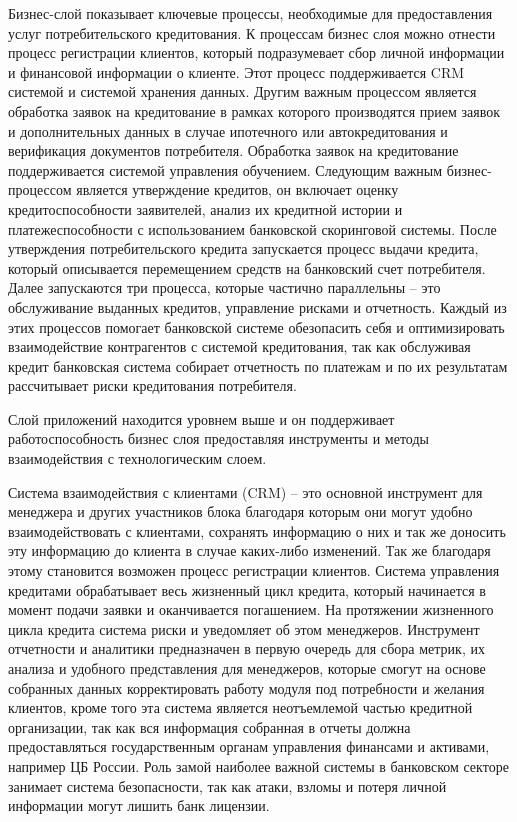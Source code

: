 \documentclass[14pt, a4paper]{extarticle}
\begin{document}
Бизнес-слой показывает ключевые процессы, необходимые для предоставления услуг
потребительского кредитования. К процессам бизнес слоя можно отнести процесс
регистрации клиентов, который подразумевает сбор личной информации и финансовой
информации о клиенте. Этот процесс поддерживается CRM системой и системой
хранения данных. Другим важным процессом является обработка заявок на
кредитование в рамках которого производятся прием заявок и дополнительных
данных в случае ипотечного или автокредитования и верификация документов
потребителя. Обработка заявок на кредитование поддерживается системой
управления обучением. Следующим важным бизнес-процессом является утверждение
кредитов, он включает оценку кредитоспособности заявителей, анализ их кредитной
истории и платежеспособности с использованием банковской скоринговой системы.
После утверждения потребительского кредита запускается процесс выдачи
кредита, который описывается перемещением средств на банковский счет
потребителя. Далее запускаются три процесса, которые частично параллельны --
это обслуживание выданных кредитов, управление рисками и отчетность. Каждый из
этих процессов помогает банковской системе обезопасить себя и оптимизировать
взаимодействие контрагентов с системой кредитования, так как обслуживая кредит 
банковская система собирает отчетность по платежам и по их результатам
рассчитывает риски кредитования потребителя.

Слой приложений находится уровнем выше и он поддерживает работоспособность
бизнес слоя предоставляя инструменты и методы взаимодействия с технологическим 
слоем.

Система взаимодействия с клиентами (CRM) -- это основной инструмент для
менеджера и других участников блока благодаря которым они могут удобно
взаимодействовать с клиентами, сохранять информацию о них и так же доносить эту
информацию до клиента в случае каких-либо изменений. Так же благодаря этому
становится возможен процесс регистрации клиентов. Система управления кредитами
обрабатывает весь жизненный цикл кредита, который начинается в момент подачи
заявки и оканчивается погашением. На протяжении жизненного цикла кредита
система риски и уведомляет об этом менеджеров. Инструмент отчетности и
аналитики предназначен в первую очередь для сбора метрик, их анализа и удобного
представления для менеджеров, которые смогут на основе собранных данных
корректировать работу модуля под потребности и желания клиентов, кроме того эта
система является неотъемлемой частью кредитной организации, так как вся
информация собранная в отчеты должна предоставляться государственным органам
управления финансами и активами, например ЦБ России. Роль замой наиболее важной
системы в банковском секторе занимает система безопасности, так как атаки,
взломы и потеря личной информации могут лишить банк лицензии.
\end{document}
